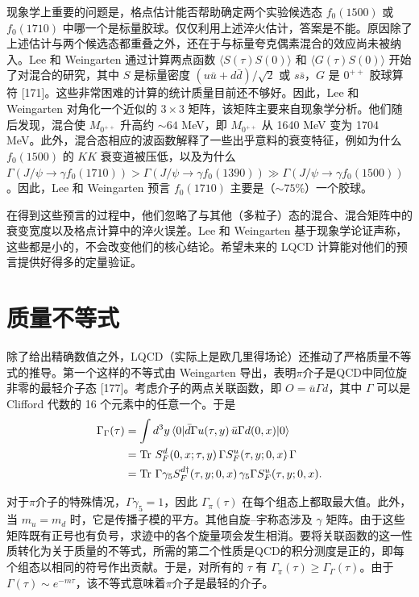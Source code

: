 现象学上重要的问题是，格点估计能否帮助确定两个实验候选态 $f_0(1500)$ 或 $f_0(1710)$ 中哪一个是标量胶球。仅仅利用上述淬火估计，答案是不能。原因除了上述估计与两个候选态都重叠之外，还在于与标量夸克偶素混合的效应尚未被纳入。Lee 和 Weingarten 通过计算两点函数 $\langle S(\tau) S(0) \rangle$ 和 $\langle G(\tau) S(0) \rangle$ 开始了对混合的研究，其中 $S$ 是标量密度 $(u\bar{u} + d\bar{d})/\sqrt{2}$ 或 $s\bar{s}$，$G$ 是 $0^{++}$ 胶球算符 [171]。这些非常困难的计算的统计质量目前还不够好。因此，Lee 和 Weingarten 对角化一个近似的 $3 \times 3$ 矩阵，该矩阵主要来自现象学分析。他们随后发现，混合使 $M_{0^{++}}$ 升高约 $\sim 64$ MeV，即 $M_{0^{++}}$ 从 1640 MeV 变为 1704 MeV。此外，混合态相应的波函数解释了一些出乎意料的衰变特征，例如为什么 $f_0(1500)$ 的 $KK$ 衰变道被压低，以及为什么 $\Gamma(J/\psi \to \gamma f_0(1710)) > \Gamma(J/\psi \to \gamma f_0(1390)) \gg \Gamma(J/\psi \to \gamma f_0(1500))$。因此，Lee 和 Weingarten 预言 $f_0(1710)$ 主要是（$\sim 75\%$）一个胶球。

在得到这些预言的过程中，他们忽略了与其他（多粒子）态的混合、混合矩阵中的衰变宽度以及格点计算中的淬火误差。Lee 和 Weingarten 基于现象学论证声称，这些都是小的，不会改变他们的核心结论。希望未来的 LQCD 计算能对他们的预言提供好得多的定量验证。

\section{质量不等式}

除了给出精确数值之外，LQCD（实际上是欧几里得场论）还推动了严格质量不等式的推导。第一个这样的不等式由 Weingarten 导出，表明$\pi$介子是QCD中同位旋非零的最轻介子态 [177]。考虑介子的两点关联函数，即 $O = \bar{u}\Gamma d$，其中 $\Gamma$ 可以是 Clifford 代数的 16 个元素中的任意一个。于是
\begin{equation}
\begin{aligned}
\Gamma_{\Gamma}(\tau) &= \int d^3y\, \langle 0 | \bar{d}\Gamma u(\tau, y)\, \bar{u}\Gamma d(0, x) | 0 \rangle \\
&= \Tr\, S_F^d(0,x;\tau,y)\,\Gamma S_F^u(\tau,y;0,x)\,\Gamma \\
&= \Tr\, \Gamma\gamma_5 S_F^{d\dagger}(\tau,y;0,x)\,\gamma_5 \Gamma S_F^u(\tau,y;0,x).
\end{aligned}
\label{eq:18.4}
\end{equation}

对于$\pi$介子的特殊情况，$\Gamma\gamma_5 = 1$，因此 $\Gamma_\pi(\tau)$ 在每个组态上都取最大值。此外，当 $m_u = m_d$ 时，它是传播子模的平方。其他自旋–宇称态涉及 $\gamma$ 矩阵。由于这些矩阵既有正号也有负号，求迹中的各个旋量项会发生相消。要将关联函数的这一性质转化为关于质量的不等式，所需的第二个性质是QCD的积分测度是正的，即每个组态以相同的符号作出贡献。于是，对所有的 $\tau$ 有 $\Gamma_\pi(\tau) \ge \Gamma_\Gamma(\tau)$。由于 $\Gamma(\tau) \sim e^{-m\tau}$，该不等式意味着$\pi$介子是最轻的介子。

